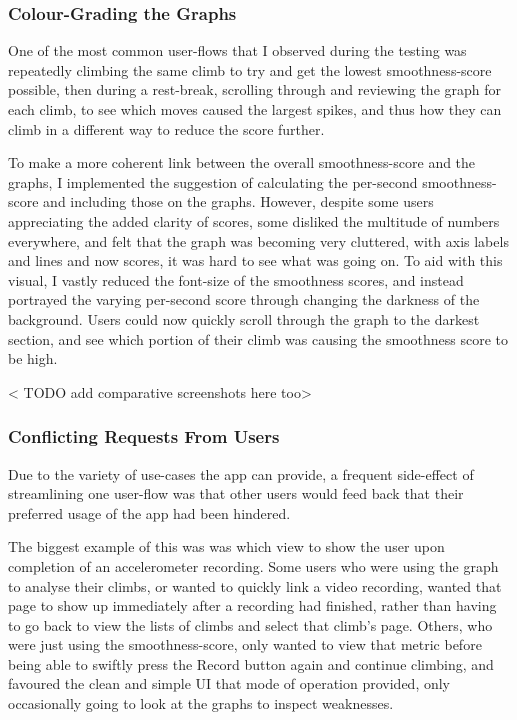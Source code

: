 \subsubsection{Colour-Grading the Graphs}
One of the most common user-flows that I observed during the testing was repeatedly climbing the same climb to try and get the lowest smoothness-score possible, then during a rest-break, scrolling through and reviewing the graph for each climb, to see which moves caused the largest spikes, and thus how they can climb in a different way to reduce the score further.

To make a more coherent link between the overall smoothness-score and the graphs, I implemented the suggestion of calculating the per-second smoothness-score and including those on the graphs.
However, despite some users appreciating the added clarity of scores, some disliked the multitude of numbers everywhere, and felt that the graph was becoming very cluttered, with axis labels and lines and now scores, it was hard to see what was going on.
To aid with this visual, I vastly reduced the font-size of the smoothness scores, 
and instead portrayed the varying per-second score through changing the darkness of the background.
Users could now quickly scroll through the graph to the darkest section, and see which portion of their climb was causing the smoothness score to be high.


< TODO add comparative screenshots here too>



\subsubsection{Conflicting Requests From Users}
Due to the variety of use-cases the app can provide, a frequent side-effect of streamlining one user-flow was that other users would feed back that their preferred usage of the app had been hindered.

The biggest example of this was was which view to show the user upon completion of an accelerometer recording.
Some users who were using the graph to analyse their climbs, or wanted to quickly link a video recording, wanted that page to show up immediately after a recording had finished, rather than having to go back to view the lists of climbs and select that climb's page.
Others, who were just using the smoothness-score, only wanted to view that metric before being able to swiftly press the Record button again and continue climbing, and favoured the clean and simple UI that mode of operation provided, only occasionally going to look at the graphs to inspect weaknesses.

